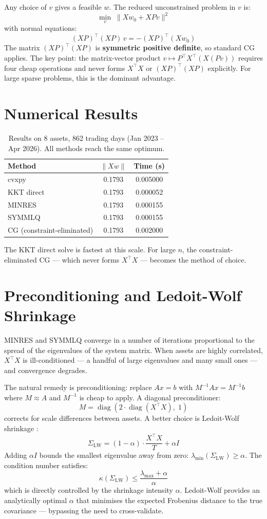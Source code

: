 \documentclass[11pt, a4paper]{article}
\begin{document}
Any choice of $v$ gives a feasible $w$. The reduced unconstrained problem in $v$ is:
\[
\min_v \; \|Xw_0 + XPv\|^2
\]
with normal equations:
\[
(XP)^\top (XP) \, v = -(XP)^\top (Xw_0)
\]
The matrix $(XP)^\top(XP)$ is \textbf{symmetric positive definite}, so standard CG applies. The key point: the matrix-vector product $v \mapsto P^\top X^\top (X(Pv))$ requires four cheap operations and never forms $X^\top X$ or $(XP)^\top(XP)$ explicitly. For large sparse problems, this is the dominant advantage.

\section{Numerical Results}

\begin{table}[h]
\centering
\begin{tabular}{lcc}
\toprule
Method & $\|Xw\|$ & Time (s) \\
\midrule
cvxpy                      & 0.1793 & 0.005000 \\
KKT direct                 & 0.1793 & 0.000052 \\
MINRES                     & 0.1793 & 0.000155 \\
SYMMLQ                     & 0.1793 & 0.000155 \\
CG (constraint-eliminated) & 0.1793 & 0.002000 \\
\bottomrule
\end{tabular}
\caption{Results on 8 assets, 862 trading days (Jan 2023 -- Apr 2026). All methods reach the same optimum.}
\end{table}

The KKT direct solve is fastest at this scale. For large $n$, the constraint-eliminated CG — which never forms $X^\top X$ — becomes the method of choice.

\section{Preconditioning and Ledoit-Wolf Shrinkage}

MINRES and SYMMLQ converge in a number of iterations proportional to the spread of the eigenvalues of the system matrix. When assets are highly correlated, $X^\top X$ is ill-conditioned — a handful of large eigenvalues and many small ones — and convergence degrades.

The natural remedy is preconditioning: replace $Ax = b$ with $M^{-1}Ax = M^{-1}b$ where $M \approx A$ and $M^{-1}$ is cheap to apply. A diagonal preconditioner:
\[
M = \operatorname{diag}\!\left(2 \cdot \operatorname{diag}(X^\top X),\; 1\right)
\]
corrects for scale differences between assets. A better choice is Ledoit-Wolf shrinkage \cite{ledoit2004}:
\[
\Sigma_{\text{LW}} = (1-\alpha) \cdot \frac{X^\top X}{T} + \alpha I
\]
Adding $\alpha I$ bounds the smallest eigenvalue away from zero: $\lambda_{\min}(\Sigma_{\text{LW}}) \geq \alpha$. The condition number satisfies:
\[
\kappa(\Sigma_{\text{LW}}) \leq \frac{\lambda_{\max} + \alpha}{\alpha}
\]
which is directly controlled by the shrinkage intensity $\alpha$. Ledoit-Wolf provides an analytically optimal $\alpha$ that minimises the expected Frobenius distance to the true covariance — bypassing the need to cross-validate.
\end{document}
